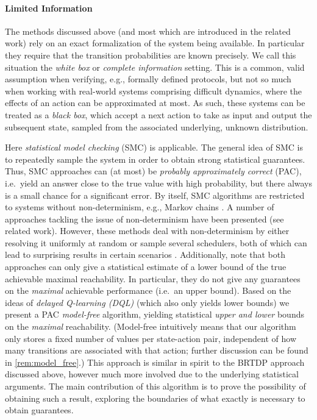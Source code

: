 \documentclass{article}
\begin{document}
\paragraph{Limited Information}
The methods discussed above (and most which are introduced in the related work) rely on an exact formalization of the system being available.
In particular they require that the transition probabilities are known precisely.
We call this situation the \emph{white box} or \emph{complete information} setting.
This is a common, valid assumption when verifying, e.g., formally defined protocols, but not so much when working with real-world systems comprising difficult dynamics, where the effects of an action can be approximated at most.
As such, these systems can be treated as a \emph{black box}, which accept a next action to take as input and output the subsequent state, sampled from the associated underlying, unknown distribution.

Here \emph{statistical model checking} (SMC) \cite{DBLP:conf/cav/YounesS02,DBLP:conf/vmcai/HeraultLMP04} is applicable.
The general idea of SMC is to repeatedly sample the system in order to obtain strong statistical guarantees.
Thus, SMC approaches can (at most) be \emph{probably approximately correct} (PAC), i.e.\ yield an answer close to the true value with high probability, but there always is a small chance for a significant error.
By itself, SMC algorithms are restricted to systems without non-determinism, e.g., Markov chains \cite{DBLP:conf/cav/Younes05a,DBLP:conf/qest/SenVA05}.
A number of approaches tackling the issue of non-determinism have been presented (see related work).
However, these methods deal with non-determinism by either resolving it uniformly at random or sample several schedulers, both of which can lead to surprising results in certain scenarios \cite{DBLP:conf/isola/BohlenderBJKNN14}.
Additionally, note that both approaches can only give a statistical estimate of a lower bound of the true achievable maximal reachability.
In particular, they do not give any guarantees on the \emph{maximal} achievable performance (i.e.\ an upper bound). Based on the ideas of \emph{delayed Q-learning (DQL)} \cite{DBLP:conf/icml/StrehlLWLL06} (which also only yields lower bounds) we present a PAC \emph{model-free} algorithm, yielding statistical \emph{upper and lower} bounds on the \emph{maximal} reachability.
(Model-free intuitively means that our algorithm only stores a fixed number of values per state-action pair, independent of how many transitions are associated with that action; further discussion can be found in \cref{rem:model_free}.)
This approach is similar in spirit to the BRTDP approach discussed above, however much more involved due to the underlying statistical arguments.
The main contribution of this algorithm is to prove the possibility of obtaining such a result, exploring the boundaries of what exactly is necessary to obtain guarantees.
\end{document}
